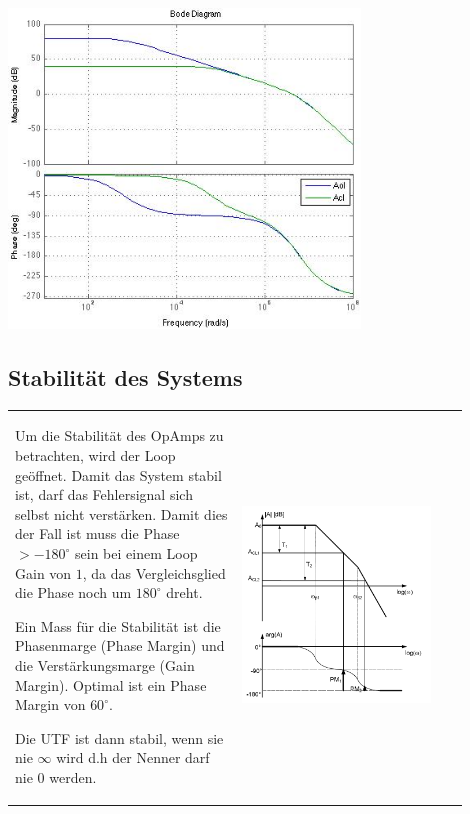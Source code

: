 \begin{minipage}{0.39\textwidth}
\includegraphics[width=0.7\textwidth, valign=t]{./pictures/AolAcl.png}
\end{minipage}

\vspace{-7mm}
\subsection{Stabilität des Systems}
\begin{tabular}{m{0.45\linewidth}m{0.45\linewidth}}
    Um die Stabilität des OpAmps zu betrachten, wird der Loop geöffnet. Damit das System stabil ist, darf das       
    Fehlersignal sich selbst nicht verstärken. Damit dies der Fall ist muss die Phase $>-180^\circ$ sein bei einem Loop Gain von $1$, da das Vergleichsglied die Phase noch um $180^\circ$ dreht. 
    
    Ein Mass für die Stabilität ist die 
    Phasenmarge (Phase Margin) und die Verstärkungsmarge (Gain Margin). Optimal ist ein Phase Margin von $60^{\circ}$.
    
    Die UTF ist dann stabil, wenn sie nie $\infty$ wird d.h der Nenner darf nie 0 werden.
    & \begin{center}
        \includegraphics[width=5cm, valign=t]{pictures/margins.png}
    \end{center}
\end{tabular}

